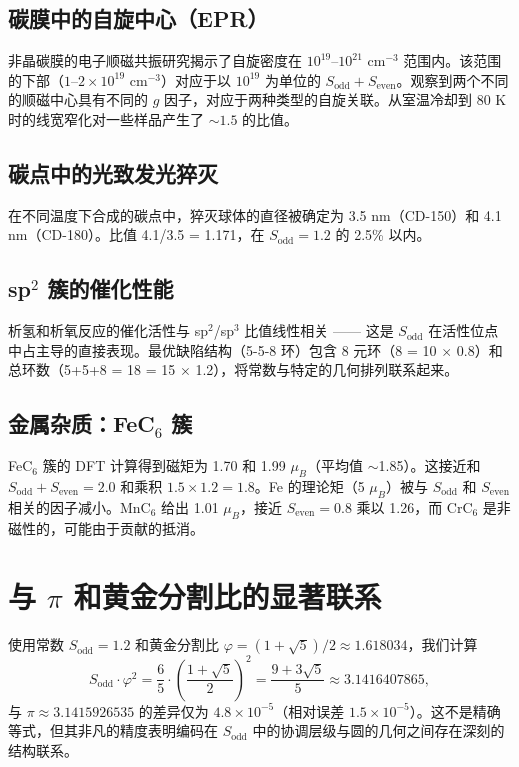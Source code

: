 \documentclass[12pt,a4paper]{article}
\begin{document}
	\subsection{碳膜中的自旋中心（EPR）}
	非晶碳膜的电子顺磁共振研究揭示了自旋密度在 \(10^{19}\)--\(10^{21}\) cm\({}^{-3}\) 范围内。该范围的下部（\(1\)--\(2\times10^{19}\) cm\({}^{-3}\)）对应于以 \(10^{19}\) 为单位的 \(S_{\text{odd}}+S_{\text{even}}\)。观察到两个不同的顺磁中心具有不同的 \(g\) 因子，对应于两种类型的自旋关联。从室温冷却到 80 K 时的线宽窄化对一些样品产生了 \(\sim 1.5\) 的比值。
	
	\subsection{碳点中的光致发光猝灭}
	在不同温度下合成的碳点中，猝灭球体的直径被确定为 3.5 nm（CD-150）和 4.1 nm（CD-180）。比值 4.1/3.5 = 1.171，在 \(S_{\text{odd}}=1.2\) 的 2.5\% 以内。
	
	\subsection{sp\({}^2\) 簇的催化性能}
	析氢和析氧反应的催化活性与 sp\({}^2\)/sp\({}^3\) 比值线性相关 —— 这是 \(S_{\text{odd}}\) 在活性位点中占主导的直接表现。最优缺陷结构（5-5-8 环）包含 8 元环（8 = 10 \(\times\) 0.8）和总环数（5+5+8 = 18 = 15 \(\times\) 1.2），将常数与特定的几何排列联系起来。
	
	\subsection{金属杂质：FeC\({}_6\) 簇}
	FeC\({}_6\) 簇的 DFT 计算得到磁矩为 1.70 和 1.99 \(\mu_B\)（平均值 \(\sim\)1.85）。这接近和 \(S_{\text{odd}}+S_{\text{even}}=2.0\) 和乘积 \(1.5\times1.2=1.8\)。Fe 的理论矩（5 \(\mu_B\)）被与 \(S_{\text{odd}}\) 和 \(S_{\text{even}}\) 相关的因子减小。MnC\({}_6\) 给出 1.01 \(\mu_B\)，接近 \(S_{\text{even}}=0.8\) 乘以 1.26，而 CrC\({}_6\) 是非磁性的，可能由于贡献的抵消。
	
	\section{与 \(\pi\) 和黄金分割比的显著联系}
	\label{sec:pi_relation}
	
	使用常数 \(S_{\text{odd}} = 1.2\) 和黄金分割比 \(\varphi = (1+\sqrt{5})/2 \approx 1.618034\)，我们计算
	\[
	S_{\text{odd}} \cdot \varphi^2 = \frac{6}{5} \cdot \left(\frac{1+\sqrt{5}}{2}\right)^2 = \frac{9+3\sqrt{5}}{5} \approx 3.1416407865,
	\]
	与 \(\pi \approx 3.1415926535\) 的差异仅为 \(4.8\times10^{-5}\)（相对误差 \(1.5\times10^{-5}\)）。这不是精确等式，但其非凡的精度表明编码在 \(S_{\text{odd}}\) 中的协调层级与圆的几何之间存在深刻的结构联系。
	
\end{document}
